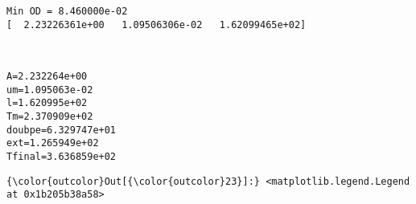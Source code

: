 \documentclass[11pt]{article}
\begin{document}
    \begin{Verbatim}[commandchars=\\\{\}]
Min OD = 8.460000e-02
[  2.23226361e+00   1.09506306e-02   1.62099465e+02]

    \end{Verbatim}

    \begin{center}
    \end{center}
    { \hspace*{\fill} \\}
    
    \begin{Verbatim}[commandchars=\\\{\}]
A=2.232264e+00
um=1.095063e-02
l=1.620995e+02
Tm=2.370909e+02
doubpe=6.329747e+01
ext=1.265949e+02
Tfinal=3.636859e+02

    \end{Verbatim}

            \begin{Verbatim}[commandchars=\\\{\}]
{\color{outcolor}Out[{\color{outcolor}23}]:} <matplotlib.legend.Legend at 0x1b205b38a58>
\end{Verbatim}
        
    \begin{center}
    \end{center}
    { \hspace*{\fill} \\}
    
    \begin{center}
    \end{center}
    { \hspace*{\fill} \\}
    
\end{document}
